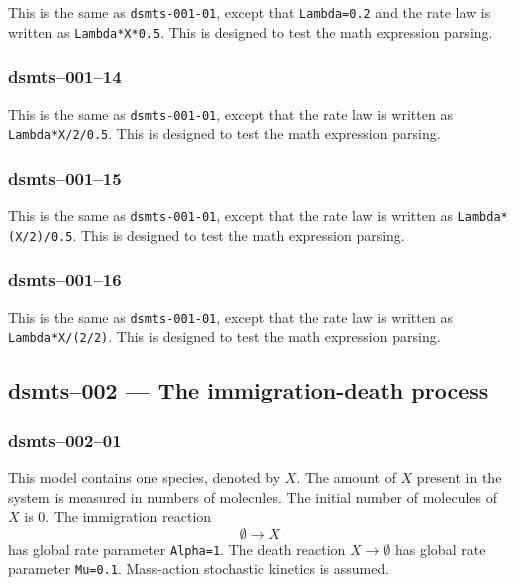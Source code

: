 This is the same as \verb$dsmts-001-01$, except that \verb$Lambda=0.2$
and the rate law is
written as \verb$Lambda*X*0.5$. This is designed to test the math
expression parsing.


\subsubsection{dsmts--001--14}

This is the same as \verb$dsmts-001-01$, except that the rate law is
written as \verb$Lambda*X/2/0.5$. This is designed to test the math
expression parsing.


\subsubsection{dsmts--001--15}

This is the same as \verb$dsmts-001-01$, except that the rate law is
written as \verb$Lambda*(X/2)/0.5$. This is designed to test the math
expression parsing.


\subsubsection{dsmts--001--16}

This is the same as \verb$dsmts-001-01$, except that the rate law is
written as \verb$Lambda*X/(2/2)$. This is designed to test the math
expression parsing.


\subsection{dsmts--002 --- The
immigration-death process}

\subsubsection{dsmts--002--01}

This model contains one species,
denoted by $X$. The amount of $X$ present in the system is measured in
numbers of molecules. The initial number of molecules of $X$ is $0$. The
immigration reaction 
\[
\emptyset \longrightarrow X
\]
 has global rate parameter \texttt{Alpha=1}. The death
reaction $X\longrightarrow \emptyset$ has global rate parameter
\texttt{Mu=0.1}. Mass-action stochastic kinetics is assumed.

